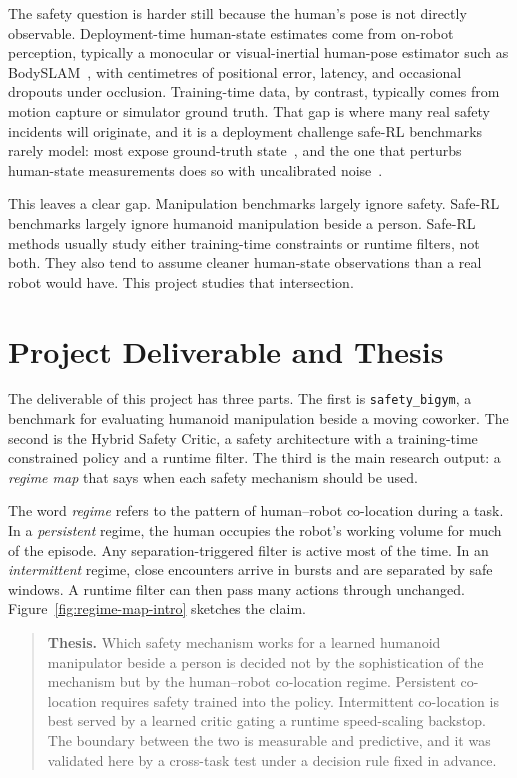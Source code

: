 \documentclass[11pt,a4paper]{report}
\newcommand{\sbigym}{\texttt{safety\_bigym}}
\newcommand{\bodyslampp}{BodySLAM\nolinebreak[4]\hspace{-.05em}\raisebox{.2ex}{\scriptsize ++}}
\begin{document}
The safety question is harder still because the human's pose is not
directly observable. Deployment-time human-state estimates come from
on-robot perception, typically a monocular or visual-inertial
human-pose estimator such as
\bodyslampp{}~\cite{henning2023bodyslampp}, with centimetres of
positional error, latency, and occasional dropouts under occlusion.
Training-time data, by contrast, typically comes from motion capture
or simulator ground truth. That gap is where many real safety
incidents will originate, and it is a deployment challenge safe-RL
benchmarks rarely model: most expose ground-truth
state~\cite{ji2023safetygymnasium,yuan2022safecontrolgym},
and the one that perturbs human-state measurements does so with
uncalibrated noise~\cite{thumm2024humanrobotgym}.

This leaves a clear gap. Manipulation benchmarks largely ignore
safety. Safe-RL benchmarks largely ignore humanoid manipulation beside
a person. Safe-RL methods usually study either training-time
constraints or runtime filters, not both. They also tend to assume
cleaner human-state observations than a real robot would have. This
project studies that intersection.

\section{Project Deliverable and Thesis}
\label{sec:intro:problem}

The deliverable of this project has three parts. The first is
\sbigym{}, a benchmark for evaluating humanoid manipulation beside a
moving coworker. The second is the Hybrid Safety Critic, a safety
architecture with a training-time constrained policy and a runtime
filter. The third is the main research output: a \emph{regime map}
that says when each safety mechanism should be used.

The word \emph{regime} refers to the pattern of human--robot
co-location during a task. In a \emph{persistent} regime, the human
occupies the robot's working volume for much of the episode. Any
separation-triggered filter is active most of the time. In an
\emph{intermittent} regime, close encounters arrive in bursts and are
separated by safe windows. A runtime filter can then pass many actions
through unchanged. Figure~\ref{fig:regime-map-intro} sketches the
claim.

\begin{quote}
\textbf{Thesis.} Which safety mechanism works for a learned humanoid
manipulator beside a person is decided not by the sophistication of
the mechanism but by the human--robot co-location regime. Persistent
co-location requires safety trained into the policy. Intermittent
co-location is best served by a learned critic gating a runtime
speed-scaling backstop. The boundary between the two is measurable
and predictive, and it was validated here by a cross-task test under
a decision rule fixed in advance.
\end{quote}
\end{document}
